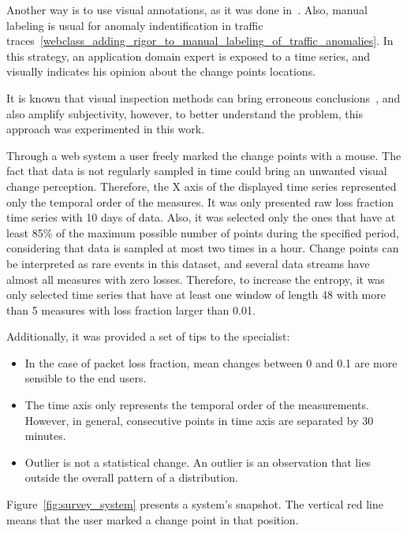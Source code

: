 Another way is to use visual annotations,
as it was done
in~\cite{learning_sparse_penalties_for_change_point_detection_using_max_margin_interval_regression}.
Also, manual labeling is usual for anomaly indentification in traffic
traces~\ref{webclass_adding_rigor_to_manual_labeling_of_traffic_anomalies}.
In this strategy, an application domain expert is exposed to a time series,
and visually indicates his opinion about the change points locations.

It is known that visual inspection methods can bring erroneous
conclusions~\cite{leveraging_cloud_data_to_mitigate_user_experience_from_breaking_bad},
and also amplify subjectivity, however, to better understand the problem, this
approach was experimented in this work.

Through a web system a user freely marked the change points with a mouse.
The fact that data is not regularly sampled in time could bring an unwanted
visual change perception. Therefore, the X axis of the displayed time series
represented only the temporal order of the measures.
It was only presented raw
loss fraction time series with 10 days of data.
Also, it was selected only the ones that have at
least 85\% of the maximum possible number of points during the specified period,
considering that data is sampled at most two times in a hour. Change points can
be interpreted as rare events in this dataset, and several data streams have
almost
all measures with zero losses. Therefore, to increase the entropy,
it was only selected time series that have at least one window of length 48 with
more than 5 measures with loss fraction larger than 0.01.

Additionally, it was provided a set of tips to the specialist:

\begin{itemize}
    \item In the case of packet loss fraction, mean changes between 0 and 0.1
    are more sensible to the end users.
    \item The time axis only represents the temporal order of the measurements.
    However, in general, consecutive points in time axis are separated by 30
    minutes.
    \item Outlier is not a statistical change. An outlier is an observation that
    lies outside the overall pattern of a distribution.
\end{itemize}

Figure~\ref{fig:survey_system} presents a system's snapshot.
The vertical red line means that the user marked a change point in that
position.

